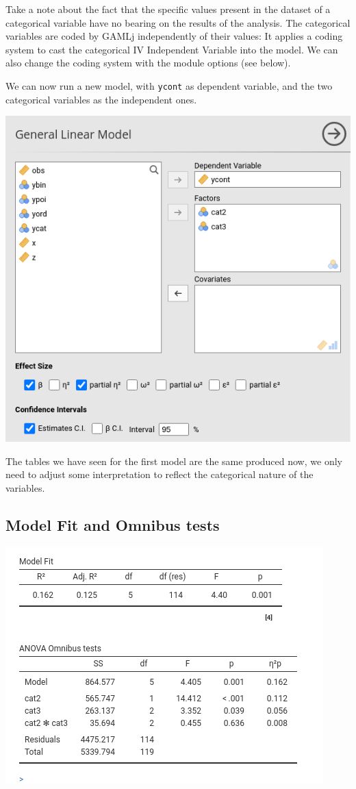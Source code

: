 \documentclass[
]{book}
\begin{document}
Take a note about the fact that the specific values present in the dataset of a categorical variable have no bearing on the results of the analysis. The categorical variables are coded by {GAMLj} independently of their values: It applies a coding system to cast the categorical {IV {Independent Variable} } into the model. We can also change the coding system with the module options (see below).

We can now run a new model, with \texttt{ycont} as dependent variable, and the two categorical variables as the independent ones.

\includegraphics{bookletpics/2_anova_input3.png}

The tables we have seen for the first model are the same produced now, we only need to adjust some interpretation to reflect the categorical nature of the variables.

\hypertarget{model-fit-and-omnibus-tests}{%
\subsection{Model Fit and Omnibus tests}\label{model-fit-and-omnibus-tests}}

\includegraphics{bookletpics/2_anova_output2.png}
\end{document}
